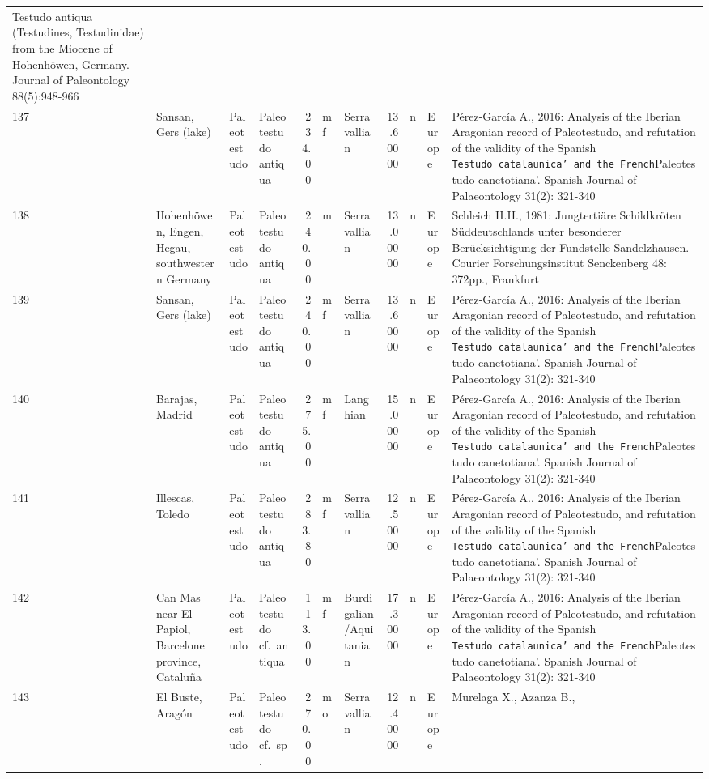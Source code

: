 \begin{landscape}
{\begin{longtable}[]{@{}llllrllrlll@{}}
	Testudo antiqua (Testudines, Testudinidae) from the Miocene of
	Hohenhöwen, Germany. Journal of Paleontology
	88(5):948-966\tabularnewline
	137 & Sansan, Gers (lake) & Paleotestudo & Paleotestudo antiqua & 234.00
	& mf & Serravallian & 13.60000 & n & Europe & Pérez-García A., 2016:
	Analysis of the Iberian Aragonian record of Paleotestudo, and refutation
	of the validity of the Spanish
	\texttt{Testudo\ catalaunica'\ and\ the\ French}Paleotestudo
	canetotiana'. Spanish Journal of Palaeontology 31(2):
	321-340\tabularnewline
	138 & Hohenhöwen, Engen, Hegau, southwestern Germany & Paleotestudo &
	Paleotestudo antiqua & 240.00 & m & Serravallian & 13.00000 & n & Europe
	& Schleich H.H., 1981: Jungtertiäre Schildkröten Süddeutschlands unter
	besonderer Berücksichtigung der Fundstelle Sandelzhausen. Courier
	Forschungsinstitut Senckenberg 48: 372pp., Frankfurt\tabularnewline
	139 & Sansan, Gers (lake) & Paleotestudo & Paleotestudo antiqua & 240.00
	& mf & Serravallian & 13.60000 & n & Europe & Pérez-García A., 2016:
	Analysis of the Iberian Aragonian record of Paleotestudo, and refutation
	of the validity of the Spanish
	\texttt{Testudo\ catalaunica'\ and\ the\ French}Paleotestudo
	canetotiana'. Spanish Journal of Palaeontology 31(2):
	321-340\tabularnewline
	140 & Barajas, Madrid & Paleotestudo & Paleotestudo antiqua & 275.00 &
	mf & Langhian & 15.00000 & n & Europe & Pérez-García A., 2016: Analysis
	of the Iberian Aragonian record of Paleotestudo, and refutation of the
	validity of the Spanish
	\texttt{Testudo\ catalaunica'\ and\ the\ French}Paleotestudo
	canetotiana'. Spanish Journal of Palaeontology 31(2):
	321-340\tabularnewline
	141 & Illescas, Toledo & Paleotestudo & Paleotestudo antiqua & 283.80 &
	mf & Serravallian & 12.50000 & n & Europe & Pérez-García A., 2016:
	Analysis of the Iberian Aragonian record of Paleotestudo, and refutation
	of the validity of the Spanish
	\texttt{Testudo\ catalaunica'\ and\ the\ French}Paleotestudo
	canetotiana'. Spanish Journal of Palaeontology 31(2):
	321-340\tabularnewline
	142 & Can Mas near El Papiol, Barcelone province, Cataluña & Paleotestudo & Paleotestudo cf.~antiqua & 113.00
	& mf & Burdigalian/Aquitanian & 17.30000 & n & Europe & Pérez-García A.,
	2016: Analysis of the Iberian Aragonian record of Paleotestudo, and
	refutation of the validity of the Spanish
	\texttt{Testudo\ catalaunica'\ and\ the\ French}Paleotestudo
	canetotiana'. Spanish Journal of Palaeontology 31(2):
	321-340\tabularnewline
	143 & El Buste, Aragón & Paleotestudo & Paleotestudo cf.~sp. & 270.00 &
	mo & Serravallian & 12.40000 & n & Europe & Murelaga X., Azanza B.,

\end{longtable}}
\end{landscape}

